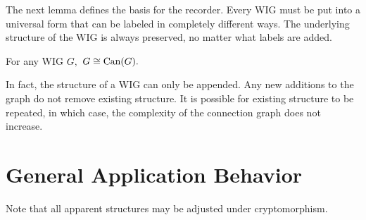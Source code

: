 The next lemma defines the basis for the recorder. Every WIG must be put into a universal form that can be labeled in completely different ways. The underlying structure of the WIG is always preserved, no matter what labels are added.
\begin{lemma} For any WIG $G,$ $G \cong \textrm{Can}(G).$
\end{lemma}

In fact, the structure of a WIG can only be appended. Any new additions to the graph do not remove existing structure. It is possible for existing structure to be repeated, in which case, the complexity of the connection graph does not increase.




\section{General Application Behavior}

Note that all apparent structures may be adjusted under cryptomorphism.


